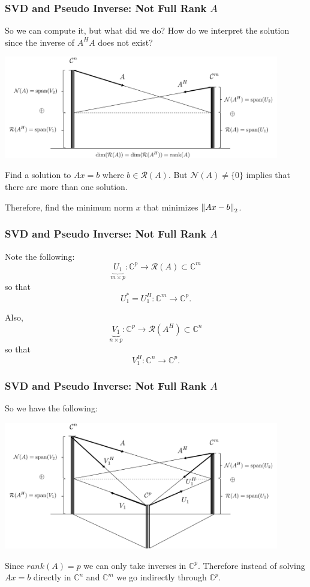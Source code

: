 \documentclass{beamer}
\begin{document}
\begin{frame}\frametitle{SVD and Pseudo Inverse: Not Full Rank $A$}
	So we can compute it, but what did we do?  How do we interpret the solution since the inverse of $A^HA$ does not exist?
	
	\begin{center}
		\includegraphics[width=0.9\textwidth]
			{figures/chap7_fundamental_subspace_3}
	\end{center}
	
	
	Find a solution to $Ax = b$ where $b \in \mathcal{R}(A)$.  But $\mathcal{N}(A)\neq \{0\}$ implies that there are more than one solution.
	
	\vfill
	
	Therefore, find the minimum norm $x$ that minimizes 
	$\left\|Ax - b\right\|_2$.
\end{frame}

\begin{frame}\frametitle{SVD and Pseudo Inverse: Not Full Rank $A$}
	Note the following:
	\[ 
		\underbrace{U_1}_{m \times p}: \mathbb{C}^p \to \mathcal{R}(A) \subset \mathbb{C}^m
	\]
	so that
	\[ 
		U_1^\ast = U_1^H:\mathbb{C}^m\to\mathbb{C}^p.
	\]
	
	Also,
	\[ 
		\underbrace{V_1}_{n\times p}: \mathbb{C}^p \to 
			\mathcal{R}(A^H) \subset \mathbb{C}^n 
	\]
	so that
	\[ 
		V_1^H : \mathbb{C}^n \to \mathbb{C}^p.
	\]	
\end{frame}

\begin{frame}\frametitle{SVD and Pseudo Inverse: Not Full Rank $A$}
	So we have the following:
	\begin{center}
		\includegraphics[width=0.9\textwidth]
			{figures/chap7_svd_1}
	\end{center}	
	Since $rank(A) = p$ we can only take inverses in 
	$\mathbb{C}^p$.  
	Therefore instead of solving $Ax=b$ directly in 
	$\mathbb{C}^n$ and 
	$\mathbb{C}^m$ we go indirectly through $\mathbb{C}^p$.
\end{frame}
\end{document}
